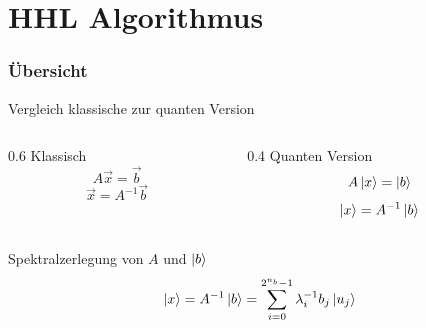 \section{HHL Algorithmus}


    \begin{frame}
    \frametitle{Übersicht}
    Vergleich klassische zur quanten Version

    \hfil

    \begin{columns}[c]
        \begin{column}{0.6\hsize}\centering
        Klassisch
        $$A \vec{x} = \vec{b}$$
        $$\vec{x} = A^{-1}\vec{b}$$
        \end{column}

        \begin{column}{0.4\hsize}
        Quanten Version
        $$A \ket{x} = \ket{b}$$
        $$\ket{x} = A^{-1}\ket{b}$$
        \end{column}
    \end{columns}

    \hfil

    \hfil
    
    Spektralzerlegung von $A$ und $\ket{b}$
    $$\ket{x} =  A^{-1} \ket{b} = \sum_{i=0}^{2^{n_b}-1} \lambda_i^{-1} b_j\ket{u_j}$$

    \end{frame}



